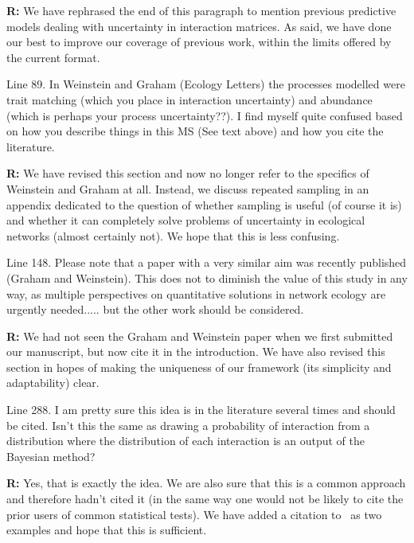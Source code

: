 \documentclass[12pt]{letter}
\newenvironment{refquote}{\bigskip \begin{it}}{\end{it}\smallskip}
\begin{document}
		\textbf{R:} We have rephrased the end of this paragraph to mention previous predictive models dealing with uncertainty in interaction matrices. As said, we have done our best to improve our coverage of previous work, within the limits offered by the current format.


		\begin{refquote}
		Line 89.  In Weinstein and Graham (Ecology Letters) the processes modelled were trait matching (which you place in interaction uncertainty) and abundance (which is perhaps your process uncertainty??).  I find myself quite confused based on how you describe things in this MS (See text above) and how you cite the literature.
		\end{refquote}


		\textbf{R:} We have revised this section and now no longer refer to the specifics of Weinstein and Graham at all. Instead, we discuss repeated sampling in an appendix dedicated to the question of whether sampling is useful (of course it is) and whether it can completely solve problems of uncertainty in ecological networks (almost certainly not). We hope that this is less confusing.


		\begin{refquote}
		Line 148.  Please note that a paper with a very similar aim was recently published (Graham and Weinstein).  This does not to diminish the value of this study in any way, as multiple perspectives on quantitative solutions in network ecology are urgently needed..... but the other work should be considered. 
		\end{refquote}


		\textbf{R:} We had not seen the Graham and Weinstein paper when we first submitted our manuscript, but now cite it in the introduction. We have also revised this section in hopes of making the uniqueness of our framework (its simplicity and adaptability) clear. %


		\begin{refquote}
		Line 288.  I am pretty sure this idea is in the literature several times and should be cited.  Isn't this the same as drawing a probability of interaction from a distribution where the distribution of each interaction is an output of the Bayesian method?
		\end{refquote}


		\textbf{R:} Yes, that is exactly the idea. We are also sure that this is a common approach and therefore hadn't cited it (in the same way one would not be likely to cite the prior users of common statistical tests). We have added a citation to~\citet{Vazquez2005,Guimera2009} as two examples and hope that this is sufficient.
\end{document}
